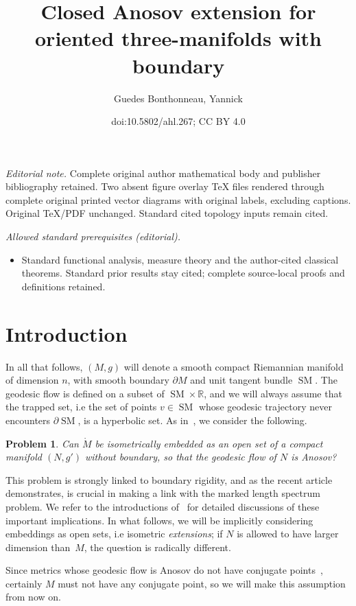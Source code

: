 \documentclass[10pt]{amsart}
\title{Closed Anosov extension for oriented three-manifolds with boundary}
\author{Guedes Bonthonneau, Yannick}
\date{doi:10.5802/ahl.267; CC BY 4.0}
\theoremstyle{definition}\newtheorem{defi}[theo]{Definition}\newtheorem{rema}[theo]{Remark}\newtheorem{exam}[theo]{Example}\newtheorem{exem}[theo]{Example}\newtheorem{nota}[theo]{Notation}
\newcommand{\R}{\mathbb{R}}
\DeclareMathOperator{\SM}{SM}
\theoremstyle{plain}
\newtheorem{probl}{Problem}
\begin{document}
\maketitle
\noindent\textit{Editorial note.} Complete original author mathematical body and publisher bibliography retained. Two absent figure overlay TeX files rendered through complete original printed vector diagrams with original labels, excluding captions. Original TeX/PDF unchanged. Standard cited topology inputs remain cited.\par\medskip
\noindent\textit{Allowed standard prerequisites (editorial).}\begin{itemize}
\item Standard functional analysis, measure theory and the author-cited classical theorems. Standard prior results stay cited; complete source-local proofs and definitions retained.
\end{itemize}\medskip


\section{Introduction}

In all that follows, $(M,g)$ will denote a smooth compact Riemannian manifold of dimension $n$, with smooth boundary $\partial M$ and unit tangent bundle $\SM$. The geodesic flow is defined on a subset of $\SM \times\R$, and we will always assume that the trapped set, i.e the set of points $v\in \SM$ whose geodesic trajectory never encounters $\partial \SM$, is a hyperbolic set. As in~\cite{Chen-Erchenko-Gogolev}, we consider the following.

\begin{probl}
\label{probA}
Can $\mathring{M}$ be isometrically embedded as an open set of a compact manifold $(N,g')$ without boundary, so that the geodesic flow of $N$ is Anosov?
\end{probl}

This problem is strongly linked to boundary rigidity, and as the recent article~\cite{Erchenko-Lefeuvre} demonstrates, is crucial in making a link with the marked length spectrum problem. We refer to the introductions of~\cite{Chen-Erchenko-Gogolev,Erchenko-Lefeuvre} for detailed discussions of these important implications. In what follows, we will be implicitly considering embeddings as open sets, i.e isometric \emph{extensions}; if $N$ is allowed to have larger dimension than~$M$, the question is radically different.


Since metrics whose geodesic flow is Anosov do not have conjugate points~\cite{Klingenberg-1974}, certainly $M$ must not have any conjugate point, so we will make this assumption from now on.
\end{document}
